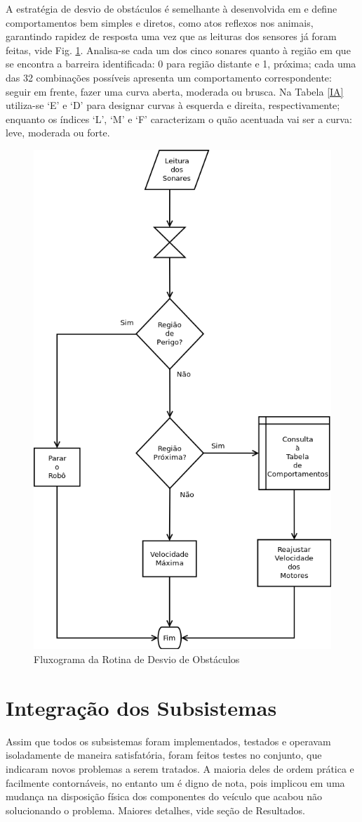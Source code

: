 A estratégia de desvio de obstáculos é semelhante à desenvolvida em \cite{Artigo_1} e define comportamentos bem simples e diretos, como atos reflexos 
nos animais, garantindo rapidez de resposta uma vez que as leituras dos sensores já foram feitas, vide Fig. \ref{ObstAvoid}.
Analisa-se cada um dos cinco sonares quanto à região em que se encontra a barreira identificada: 0 para região distante e 1, próxima;
cada uma das 32 combinações possíveis apresenta um comportamento correspondente: seguir em frente, fazer uma curva aberta, moderada ou brusca.
Na Tabela \ref{IA} utiliza-se \textquoteleft E\textquoteright{} e  \textquoteleft D\textquoteright{} para designar curvas à esquerda e direita, 
respectivamente; enquanto os índices \textquoteleft L\textquoteright{},  \textquoteleft M\textquoteright{} e \textquoteleft F\textquoteright{} 
caracterizam o quão acentuada vai ser a curva: leve, moderada ou forte. %

  \begin{figure}[H]
    \centering
    \includegraphics[width=0.5 \linewidth]{../../Imagens/ObstAvoid.png}
    \caption{Fluxograma da Rotina de Desvio de Obstáculos}
    \label{ObstAvoid}
  \end{figure}
  
\section{Integração dos Subsistemas}
Assim que todos os subsistemas foram implementados, testados e operavam isoladamente de maneira satisfatória, foram feitos testes no conjunto, que 
indicaram novos problemas a serem tratados. 
A maioria deles de ordem prática e facilmente contornáveis, no entanto um é digno de nota, pois implicou em uma mudança na disposição física dos 
componentes do veículo que acabou não solucionando o problema. Maiores detalhes, vide seção de Resultados.